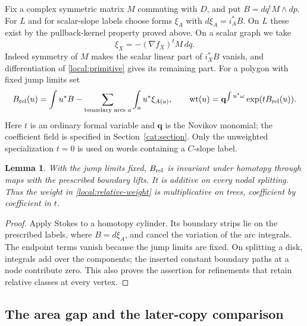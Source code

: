 \documentclass[11pt]{article}
\newtheorem{lemma}[theorem]{Lemma}
\theoremstyle{definition}
\theoremstyle{remark}
\numberwithin{equation}{section}
\begin{document}
Fix a complex symmetric matrix $M$ commuting with $D$, and put
$B=dq^tM\wedge dp$.  For $L$ and for scalar-slope labels choose forms
$\xi_A$ with $d\xi_A=i_A^*B$.  On $L$ these exist by the pullback-kernel
property proved above.  On a scalar graph we take
\begin{equation}\label{local:primitive}
 \xi_X=-(\nabla f_X)^tM\,dq.
\end{equation}
Indeed symmetry of $M$ makes the scalar linear part of $i_X^*B$ vanish,
and differentiation of \eqref{local:primitive} gives its remaining part.
For a polygon with fixed jump limits set
\begin{equation}\label{local:relative-weight}
 B_{\rm rel}(u)=\int u^*B-\sum_{\text{boundary arcs }a}
                         \int_a u^*\xi_{A(a)},\qquad
 \mathrm{wt}(u)=\mathbf q^{\int u^*\omega}\exp(tB_{\rm rel}(u)).
\end{equation}
Here $t$ is an ordinary formal variable and $\mathbf q$ is the Novikov monomial;
the coefficient field is specified in Section~\ref{cat:section}.
Only the unweighted specialization $t=0$ is used on words containing a
$C$-slope label.

\begin{lemma}\label{local:weight}
With the jump limits fixed, $B_{\rm rel}$ is invariant under homotopy
through maps with the prescribed boundary lifts.  It is additive on every
nodal splitting.  Thus the weight in \eqref{local:relative-weight} is
multiplicative on trees, coefficient by coefficient in $t$.
\end{lemma}
\begin{proof}
Apply Stokes to a homotopy cylinder.  Its boundary strips lie on the
prescribed labels, where $B=d\xi_A$, and cancel the variation of the arc
integrals.  The endpoint terms vanish because the jump limits are fixed.
On splitting a disk, integrals add over the components; the inserted
constant boundary paths at a node contribute zero.  This also proves the
assertion for refinements that retain relative classes at every vertex.
\end{proof}

\subsection{The area gap and the later-copy comparison}
\end{document}
